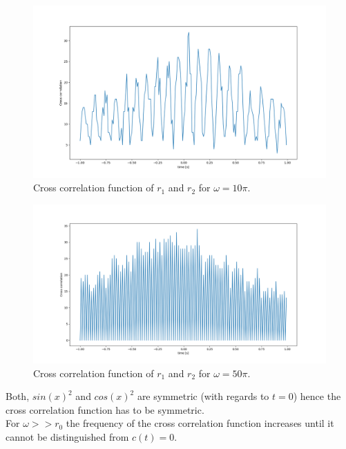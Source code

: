 \begin{figure}[H]
\centering
\includegraphics[scale=0.4]{1_a_10pi.png}
\caption{Cross correlation function of $r_1$ and $r_2$ for $\omega = 10\pi$.}
\end{figure}
\begin{figure}[H]
\centering
\includegraphics[scale=0.4]{1_a_50pi.png}
\caption{Cross correlation function of $r_1$ and $r_2$ for $\omega = 50\pi$.}
\end{figure}
Both, $sin(x)^2$ and $cos(x)^2$ are symmetric (with regards to $t = 0$) hence the cross correlation function has to be symmetric.\\
For $\omega >> r_0$ the frequency of the cross correlation function increases until it cannot be distinguished from $c(t) = 0$.
\newpage

